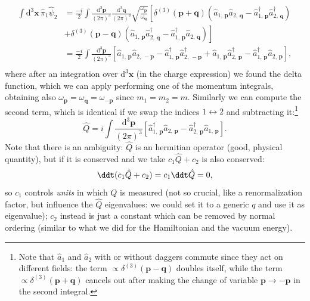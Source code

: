 \[
    \begin{aligned}
        \int \mathrm{d}^3 \mathbf{x} \, \hat{\pi}_1 \hat{\psi}_2 & =  \frac{-i}{2}\int \frac{\mathrm{d}^3 \mathbf{p}}{(2\pi)^3} \frac{\mathrm{d}^3 \mathbf{q}}{(2\pi)^3} \sqrt{\frac{\omega_{\mathbf{p}}}{\omega_{\mathbf{q}}}} \left[ \delta^{(3)}(\mathbf{p} + \mathbf{q})\left( \hat{a}_{1,\,\mathbf{p}} \hat{a}_{2,\,\mathbf{q}} - \hat{a}^{\dagger}_{1,\,\mathbf{p}} \hat{a}^{\dagger}_{2,\,\mathbf{q}}\right) \right. \\
                                                                 & \left. + \delta^{(3)}(\mathbf{p} - \mathbf{q})\left( \hat{a}_{1,\,\mathbf{p}} \hat{a}^{\dagger}_{2,\,\mathbf{q}} - \hat{a}^{\dagger}_{1,\,\mathbf{p}} \hat{a}_{2,\,\mathbf{q}}\right) \right]                                                                                                                                                            \\
                                                                 & = \frac{-i}{2} \int \frac{\mathrm{d}^3 \mathbf{p}}{(2\pi)^3} \left[\hat{a}_{1,\,\mathbf{p}} \hat{a}_{2,\,-\mathbf{p}} - \hat{a}^{\dagger}_{1,\,\mathbf{p}} \hat{a}^{\dagger}_{2,\,-\mathbf{p}} + \hat{a}_{1,\,\mathbf{p}} \hat{a}^{\dagger}_{2,\,\mathbf{p}} - \hat{a}^{\dagger}_{1,\,\mathbf{p}} \hat{a}_{2,\,\mathbf{p}} \right],                      \\
    \end{aligned}
\]
where after an integration over \(\mathrm{d}^3 \mathbf{x}\) (in the charge expression) we found the delta function, which we can apply performing one of the momentum integrals, obtaining also \(\omega_{\mathbf{p}} = \omega_{\mathbf{q}} = \omega_{-\mathbf{p}}\) since \(m_1 = m_2 = m\). Similarly we can compute the second term, which is identical if we swap the indices \(1 \leftrightarrow 2\) and subtracting it:\footnote{Note that \(\hat{a}_1\) and \(\hat{a}_2\) with or without daggers commute since they act on different fields: the term \(\propto \delta^{(3)}(\mathbf{p}-\mathbf{q})\) doubles itself, while the term \(\propto \delta^{(3)}(\mathbf{p}+\mathbf{q})\) cancels out after making the change of variable \(\mathbf{p} \to -\mathbf{p}\) in the second integral.}
\[
    \hat{Q} = i \int \frac{\mathrm{d}^3 \mathbf{p}}{(2\pi)^3} \left[ \hat{a}^{\dagger}_{1,\,\mathbf{p}} \hat{a}_{2,\,\mathbf{p}} - \hat{a}^{\dagger}_{2,\,\mathbf{p}} \hat{a}_{1,\,\mathbf{p}} \right].
\]
Note that there is an ambiguity: \(\hat{Q}\) is an hermitian operator (good, physical quantity), but if it is conserved and we take \(c_1 \hat{Q} + c_2\) is also conserved:
\[
    \ddt (c_1 \hat{Q} + c_2) = c_1 \ddt \hat{Q} = 0,
\]
so \(c_1\) controls \textit{units} in which \(Q\) is measured (not so crucial, like a renormalization factor, but influence the \(\hat{Q}\) eigenvalues: we could set it to a generic \(q\) and use it as eigenvalue); \(c_2\) instead is just a constant which can be removed by normal ordering (similar to what we did for the Hamiltonian and the vacuum energy).

